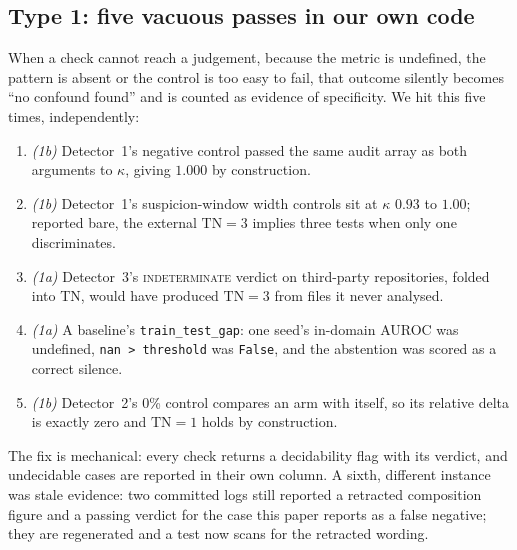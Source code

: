 \documentclass[pmlr,twocolumn,10pt]{jmlr}
\begin{document}
\subsection{Type 1: five vacuous passes in our own code}

When a check cannot reach a judgement, because the metric is undefined, the
pattern is absent or the control is too easy to fail, that outcome silently
becomes ``no confound found'' and is counted as evidence of specificity. We hit
this five times, independently:

\begin{enumerate}
\itemsep0em
  \item \emph{(1b)} Detector~1's negative control passed the same audit array as
    both arguments to $\kappa$, giving $1.000$ by construction.
  \item \emph{(1b)} Detector~1's suspicion-window width controls sit at $\kappa$
    $0.93$ to $1.00$; reported bare, the external $\mathrm{TN}=3$ implies three
    tests when only one discriminates.
  \item \emph{(1a)} Detector~3's \textsc{indeterminate} verdict on third-party
    repositories, folded into TN, would have produced $\mathrm{TN}=3$ from files it
    never analysed.
  \item \emph{(1a)} A baseline's \texttt{train\_test\_gap}: one seed's in-domain
    AUROC was undefined, \texttt{nan > threshold} was \texttt{False}, and the
    abstention was scored as a correct silence.
  \item \emph{(1b)} Detector~2's 0\% control compares an arm with itself, so its
    relative delta is exactly zero and $\mathrm{TN}=1$ holds by construction.
\end{enumerate}

The fix is mechanical: every check returns a decidability flag with its verdict,
and undecidable cases are reported in their own column. A sixth, different
instance was stale evidence: two committed logs still reported a retracted
composition figure and a passing verdict for the case this paper
reports as a false negative; they are regenerated and a test now scans for the
retracted wording.
\end{document}
